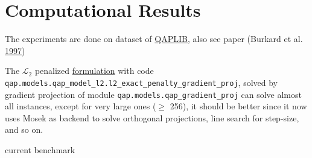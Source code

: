 \documentclass[
  10pt,
  a4paper,
,tablecaptionabove
]{scrartcl}
\begin{document}
\hypertarget{computational-results}{%
\section{Computational Results}\label{computational-results}}

The experiments are done on dataset of
\href{http://anjos.mgi.polymtl.ca/qaplib/}{QAPLIB}, also see paper
(Burkard et al. \protect\hyperlink{ref-burkard1997qaplib}{1997})

The \(\mathscr L_2\) penalized
\protect\hyperlink{mathscr-l_2--mathscr-l_1-penalized-formulation}{formulation}
with code
\texttt{qap.models.qap\_model\_l2.l2\_exact\_penalty\_gradient\_proj},
solved by gradient projection of module
\texttt{qap.models.qap\_gradient\_proj} can solve almost all instances,
except for very large ones (\(\ge\) 256), it should be better since it
now uses Mosek as backend to solve orthogonal projections, line search
for step-size, and so on.

current benchmark
\end{document}
